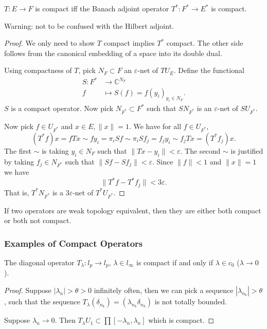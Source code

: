 \begin{proposition}[Schauder]
	\label{prop:SchauderCompactAdjoint}
	$T: E \to F$ is compact iff the Banach adjoint operator $T^*:F^* \to E^*$ is compact.
\end{proposition}
Warning: not to be confused with the Hilbert adjoint.
\begin{proof}
	We only need to show $T$ compact implies $T^*$ compact. The other side follows from the canonical embedding of a space into its double dual.

	Using compactness of $T$, pick $N_F \subset F$ an $\varepsilon$-net of $T U_E$. Define the functional
	\begin{align*}
		S: F^* &\longrightarrow \mathbb{C}^{N_F} \\
		f &\longmapsto S(f) = f(y_i)_{y_i \in N_F}
	.\end{align*}
	$S$ is a compact operator. Now pick $N_{F^*} \subset F^*$ such that $S N_{F^*}$ is an $\varepsilon$-net of $S U_{F^*}$. 

	Now pick $f \in U_{F^*}$ and $x \in E, \|x\| = 1$. We have for all $f \in U_{F^*}$,
	\[
		(T^* f) x = f T x \sim f y_i = \pi_i S f \sim \pi_i S f_j = f_j y_i \sim f_j T x = (T^* f_j) x
	.\] 
	The first $\sim $ is taking $y_i \in N_{F}$ such that $\|T x - y_i\| < \varepsilon$. The second $\sim $ is justified by taking $f_j \in N_{F^*}$ such that $\|S f - S f_j\| < \varepsilon$. Since $\|f\| < 1$ and $\|x\| = 1$ we have
	\[
		\|T^* f - T^* f_j\| < 3 \varepsilon
	.\] 
	That is, $T^* N_{F^*}$ is a $3 \varepsilon$-net of $T^* U_{F^*}$.
	
\end{proof}


\begin{proposition}
	\label{prop:CompactWeakTop}
	If two operators are weak topology equivalent, then they are either both compact or both not compact.
\end{proposition}

\subsubsection{Examples of Compact Operators}

\begin{proposition}
	\label{prop:DiagonalOperatorCompact}
	The diagonal operator $T_\lambda : l_p \to l_p$, $\lambda \in l_\infty $ is compact if and only if $\lambda \in c_0$ ($\lambda \to 0$ ).
\end{proposition}
\begin{proof}
	Suppose $|\lambda_n| > \theta > 0$ infinitely often, then we can pick a sequence $|\lambda_{n_k}| > \theta$, such that the sequence $T_\lambda\left( \delta_{n_k} \right) = \left( \lambda_{n_k}\delta_{n_k} \right) $ is not totally bounded.

	Suppose $\lambda_n \to 0$. Then $T_\lambda U_1 \subset \prod [-\lambda_n, \lambda_n]$ which is compact.
\end{proof}


